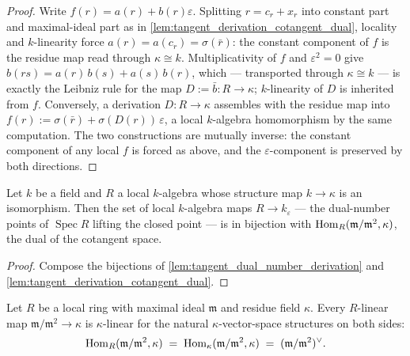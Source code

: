 \begin{proof}\leanok
  Write \(f(r) = a(r) + b(r)\varepsilon\). Splitting
  \(r = c_r + x_r\) into constant part and maximal-ideal part as in
  \cref{lem:tangent_derivation_cotangent_dual}, locality and
  \(k\)-linearity force \(a(r) = a(c_r) = \sigma(\bar r)\): the
  constant component of \(f\) is the residue map read through
  \(\kappa \cong k\). Multiplicativity of \(f\) and
  \(\varepsilon^2 = 0\) give
  \(b(rs) = a(r)\,b(s) + a(s)\,b(r)\), which — transported through
  \(\kappa \cong k\) — is exactly the Leibniz rule for the map
  \(D := \bar b : R \to \kappa\); \(k\)-linearity of \(D\) is
  inherited from \(f\). Conversely, a derivation
  \(D : R \to \kappa\) assembles with the residue map into
  \(f(r) := \sigma(\bar r) + \sigma(D(r))\,\varepsilon\), a local
  \(k\)-algebra homomorphism by the same computation. The two
  constructions are mutually inverse: the constant component of any
  local \(f\) is forced as above, and the \(\varepsilon\)-component
  is preserved by both directions.
\end{proof}

\begin{corollary}\leanok
  \label{cor:tangent_dual_number_cotangent_dual}
  Let \(k\) be a field and \(R\) a local \(k\)-algebra whose
  structure map \(k \to \kappa\) is an isomorphism. Then the set of
  local \(k\)-algebra maps \(R \to k_\varepsilon\) — the dual-number
  points of \(\operatorname{Spec} R\) lifting the closed point — is
  in bijection with
  \(\operatorname{Hom}_R(\mathfrak m/\mathfrak m^2, \kappa)\), the dual of the
  cotangent space.
\end{corollary}

\begin{proof}\leanok
  Compose the bijections of
  \cref{lem:tangent_dual_number_derivation} and
  \cref{lem:tangent_derivation_cotangent_dual}.
\end{proof}

\begin{lemma}\leanok
  \label{lem:tangent_cotangent_dual_kappa_linear}
  Let \(R\) be a local ring with maximal ideal \(\mathfrak m\) and
  residue field \(\kappa\). Every \(R\)-linear map
  \(\mathfrak m/\mathfrak m^2 \to \kappa\) is \(\kappa\)-linear for
  the natural \(\kappa\)-vector-space structures on both sides:
  \[
    \operatorname{Hom}_R(\mathfrak m/\mathfrak m^2, \kappa)
    \;=\;
    \operatorname{Hom}_\kappa(\mathfrak m/\mathfrak m^2, \kappa)
    \;=\; (\mathfrak m/\mathfrak m^2)^{\vee}.
  \]
\end{lemma}


